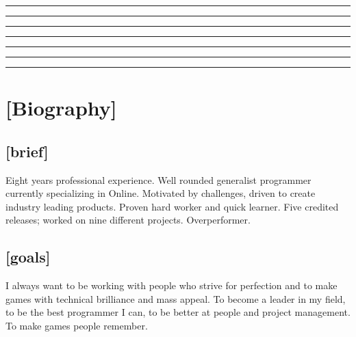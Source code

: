 \documentclass[a4paper]{res}
\newcommand{\setrule}[1]{\rule{#1}{1mm}}
\newcommand{\fibrule}[2]{ \hspace{#1}  \setrule{#2} \setrule{21mm} \setrule{13mm} \setrule{8mm} \setrule{5mm} \setrule{3mm} \setrule{2mm}  \vspace{-.52in} }
\begin{document}
 
\thispagestyle{empty} %
\address{}
\begin{resume}


\vspace{-.1in}

\fibrule{0.9in}{3.0in}
\section{[Biography]} 

\vspace{-.2in}

\subsection{[brief]}
\mbox{}
\vspace{-.18in}

Eight years professional experience.
Well rounded generalist programmer currently specializing in Online.
Motivated by challenges, driven to create industry leading products.
Proven hard worker and quick learner.
Five credited releases; worked on nine different projects. 
Overperformer.

\vspace{-.3in}

\subsection{[goals]}
\mbox{}
\vspace{-.18in}

I always want to be working with people who strive for perfection and to make games with technical brilliance and mass appeal.
To become a leader in my field, to be the best programmer I can, to be better at people and project management.
To make games people remember.



\end{resume}
\end{document}
